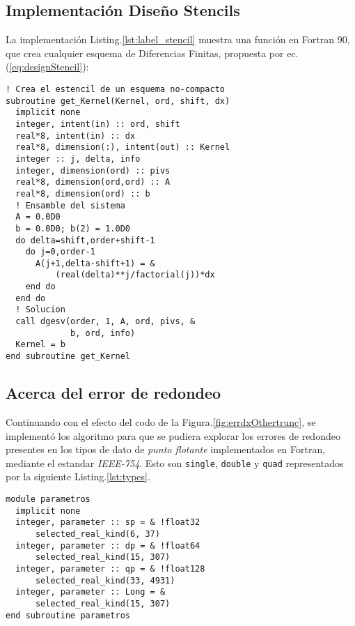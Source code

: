 \documentclass[9pt,technote,twoside,letterpaper,onecolumn]{IEEEtran}
\begin{document}
\begin{multicols}{2}
\subsection{Implementación Diseño Stencils}
\label{sec:imple}

La implementación Listing.\ref{lst:label_stencil} muestra una función en Fortran 90, que crea cualquier esquema de Diferencias Finitas, propuesta por ec.(\ref{eq:designStencil}):
\begin{center}
\begin{lstlisting}[caption={Diseño de Stencils},label={lst:label_stencil}]
! Crea el estencil de un esquema no-compacto
subroutine get_Kernel(Kernel, ord, shift, dx)
  implicit none
  integer, intent(in) :: ord, shift
  real*8, intent(in) :: dx
  real*8, dimension(:), intent(out) :: Kernel
  integer :: j, delta, info
  integer, dimension(ord) :: pivs
  real*8, dimension(ord,ord) :: A
  real*8, dimension(ord) :: b
  ! Ensamble del sistema
  A = 0.0D0
  b = 0.0D0; b(2) = 1.0D0
  do delta=shift,order+shift-1
    do j=0,order-1
      A(j+1,delta-shift+1) = &
          (real(delta)**j/factorial(j))*dx
    end do
  end do
  ! Solucion
  call dgesv(order, 1, A, ord, pivs, &
             b, ord, info)
  Kernel = b
end subroutine get_Kernel
\end{lstlisting}
\end{center}

\subsection{Acerca del error de redondeo}
\label{sec:errorred}

Continuando con el efecto del codo de la Figura.\ref{fig:errdxOthertrunc}, se implementó los algoritmo para que se pudiera explorar los errores de redondeo presentes en los tipos de dato de \emph{punto flotante} implementados en Fortran, mediante el estandar \emph{IEEE-754}. Esto son \verb.single., \verb.double. y \verb.quad. representados por la siguiente Listing.\ref{lst:types}. 
\begin{lstlisting}[caption={Punto flotante},label={lst:types}]
module parametros
  implicit none
  integer, parameter :: sp = & !float32
      selected_real_kind(6, 37)
  integer, parameter :: dp = & !float64
      selected_real_kind(15, 307)
  integer, parameter :: qp = & !float128
      selected_real_kind(33, 4931)
  integer, parameter :: Long = &
      selected_real_kind(15, 307)
end subroutine parametros
\end{lstlisting}


\end{multicols}
\end{document}
